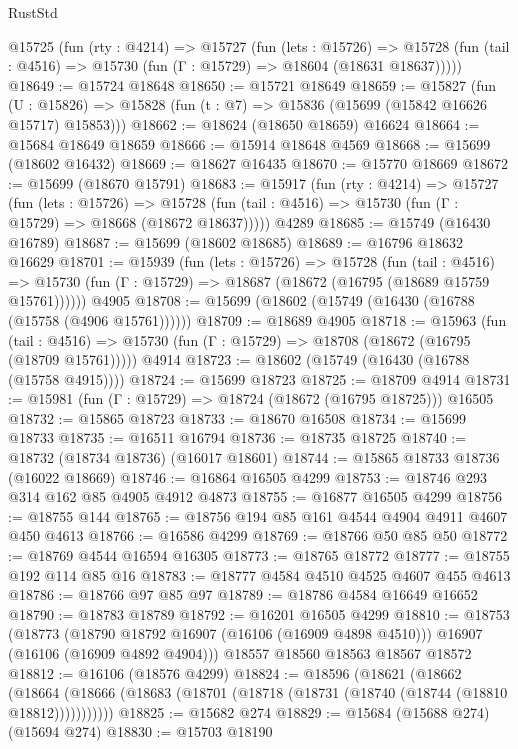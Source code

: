 \begin{lexlean}{RustStd}
\begin{coremodule}
  @15725
    (fun (rty : @4214) =>
    @15727
      (fun (lets : @15726) =>
      @15728 (fun (tail : @4516) => @15730 (fun (Γ : @15729) => @18604 (@18631 @18637)))))
@18649 := @15724 @18648
@18650 := @15721 @18649
@18659 := @15827
    (fun (U : @15826) => @15828 (fun (t : @7) => @15836 (@15699 (@15842 @16626 @15717) @15853)))
@18662 := @18624 (@18650 @18659) @16624
@18664 := @15684 @18649 @18659
@18666 := @15914 @18648 @4569
@18668 := @15699 (@18602 @16432)
@18669 := @18627 @16435
@18670 := @15770 @18669
@18672 := @15699 (@18670 @15791)
@18683 := @15917
    (fun (rty : @4214) =>
    @15727
      (fun (lets : @15726) =>
      @15728 (fun (tail : @4516) => @15730 (fun (Γ : @15729) => @18668 (@18672 @18637)))))
    @4289
@18685 := @15749 (@16430 @16789)
@18687 := @15699 (@18602 @18685)
@18689 := @16796 @18632 @16629
@18701 := @15939
    (fun (lets : @15726) =>
    @15728
      (fun (tail : @4516) =>
      @15730 (fun (Γ : @15729) => @18687 (@18672 (@16795 (@18689 @15759 @15761))))))
    @4905
@18708 := @15699 (@18602 (@15749 (@16430 (@16788 (@15758 (@4906 @15761))))))
@18709 := @18689 @4905
@18718 := @15963
    (fun (tail : @4516) => @15730 (fun (Γ : @15729) => @18708 (@18672 (@16795 (@18709 @15761)))))
    @4914
@18723 := @18602 (@15749 (@16430 (@16788 (@15758 @4915))))
@18724 := @15699 @18723
@18725 := @18709 @4914
@18731 := @15981 (fun (Γ : @15729) => @18724 (@18672 (@16795 @18725))) @16505
@18732 := @15865 @18723
@18733 := @18670 @16508
@18734 := @15699 @18733
@18735 := @16511 @16794
@18736 := @18735 @18725
@18740 := @18732 (@18734 @18736) (@16017 @18601)
@18744 := @15865 @18733 @18736 (@16022 @18669)
@18746 := @16864 @16505 @4299
@18753 := @18746 @293 @314 @162 @85 @4905 @4912 @4873
@18755 := @16877 @16505 @4299
@18756 := @18755 @144
@18765 := @18756 @194 @85 @161 @4544 @4904 @4911 @4607 @450 @4613
@18766 := @16586 @4299
@18769 := @18766 @50 @85 @50
@18772 := @18769 @4544 @16594 @16305
@18773 := @18765 @18772
@18777 := @18755 @192 @114 @85 @16
@18783 := @18777 @4584 @4510 @4525 @4607 @455 @4613
@18786 := @18766 @97 @85 @97
@18789 := @18786 @4584 @16649 @16652
@18790 := @18783 @18789
@18792 := @16201 @16505 @4299
@18810 := @18753
    (@18773
      (@18790 @18792 @16907 (@16106 (@16909 @4898 @4510)))
      @16907
      (@16106 (@16909 @4892 @4904)))
    @18557
    @18560
    @18563
    @18567
    @18572
@18812 := @16106 (@18576 @4299)
@18824 := @18596
    (@18621
      (@18662
        (@18664 (@18666 (@18683 (@18701 (@18718 (@18731 (@18740 (@18744 (@18810 @18812)))))))))))
@18825 := @15682 @274
@18829 := @15684 (@15688 @274) (@15694 @274)
@18830 := @15703 @18190

\end{coremodule}
\end{lexlean}
